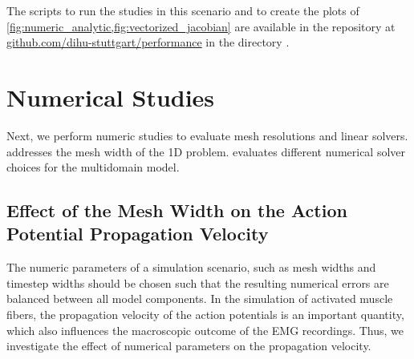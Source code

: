 \begin{reproduce_no_break}
  The scripts to run the studies in this scenario and to create the plots of \cref{fig:numeric_analytic,fig:vectorized_jacobian} are available in the repository at \href{https://github.com/dihu-stuttgart/performance}{github.com/dihu-stuttgart/performance}
  in the directory .
\end{reproduce_no_break}

\section{Numerical Studies}\label{sec:numerical_studies}

Next, we perform numeric studies to evaluate mesh resolutions and linear solvers. 
 addresses the mesh width of the 1D problem.  evaluates different numerical solver choices for the multidomain model.
\subsection{Effect of the Mesh Width on the Action Potential Propagation Velocity}\label{sec:action_potential_velocity}

The numeric parameters of a simulation scenario, such as mesh widths and timestep widths should be chosen such that the resulting numerical errors are balanced between all model components. In the simulation of activated muscle fibers, the propagation velocity of the action potentials is an important quantity, which also influences the macroscopic outcome of the EMG recordings. Thus, we investigate the effect of numerical parameters on the propagation velocity.

